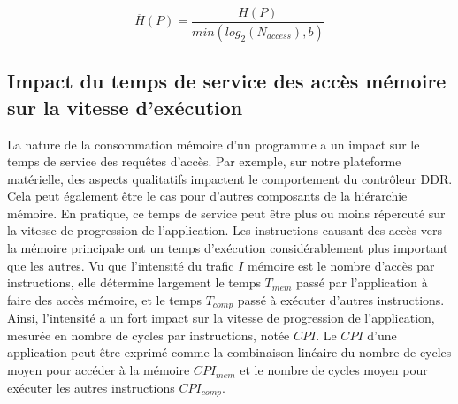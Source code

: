 \begin{equation}
\label{equation:shannon}
\overline{H}(P) = \frac{H(P)}{min(log_2(N_{access}), b)}
\end{equation}




\subsection{\label{subsection:tau}Impact du temps de service des accès mémoire sur la vitesse d'exécution}

La nature de la consommation mémoire d'un programme a un impact sur le temps de service des requêtes d'accès.
Par exemple, sur notre plateforme matérielle, des aspects qualitatifs impactent le comportement du contrôleur DDR.
Cela peut également être le cas pour d'autres composants de la hiérarchie mémoire.
En pratique, ce temps de service peut être plus ou moins répercuté sur la vitesse de progression de l'application.
Les instructions causant des accès vers la mémoire principale ont un temps d'exécution considérablement plus important que les autres.
Vu que l'intensité du trafic $I$  mémoire est le nombre d'accès par instructions, elle détermine largement le temps $T_{mem}$ passé par l'application à faire des accès mémoire, et le temps $T_{comp}$ passé à exécuter d'autres instructions.
Ainsi, l'intensité a un fort impact sur la vitesse de progression de l'application, mesurée en nombre de cycles par instructions, notée $CPI$. 
Le $CPI$ d'une application peut être exprimé comme la combinaison linéaire du nombre de cycles moyen pour accéder à la mémoire $CPI_{mem}$ et le nombre de cycles moyen pour exécuter les autres instructions $CPI_{comp}$.


